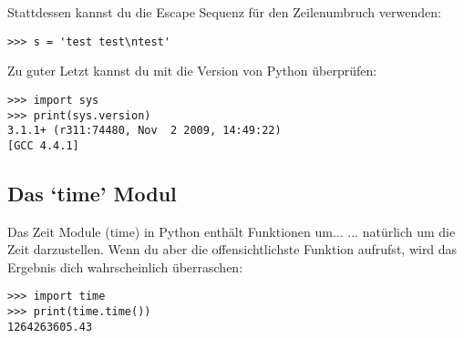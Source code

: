 Stattdessen kannst du die Escape Sequenz für den Zeilenumbruch verwenden:
\begin{Verbatim}[frame=single]
>>> s = 'test test\ntest'
\end{Verbatim}

\noindent
Zu guter Letzt kannst du mit  die Version von Python überprüfen:

\begin{Verbatim}[frame=single]
>>> import sys
>>> print(sys.version)
3.1.1+ (r311:74480, Nov  2 2009, 14:49:22) 
[GCC 4.4.1]
\end{Verbatim}

\subsection*{Das `time' Modul}

Das Zeit Module (time) in Python enthält Funktionen um\texorpdfstring{$\ldots$}{...} ... natürlich um die Zeit darzustellen. Wenn du aber die offensichtlichste Funktion  aufrufst, wird das Ergebnis dich wahrscheinlich überraschen:

\begin{Verbatim}[frame=single]
>>> import time
>>> print(time.time())
1264263605.43
\end{Verbatim}


